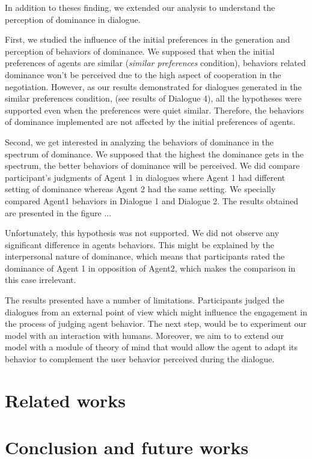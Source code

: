 \documentclass{llncs}
\begin{document}
			 In addition to theses finding, we extended our analysis to understand the perception of dominance in dialogue.
			 
			 First, we studied the influence of the initial preferences in the generation and perception of behaviors of dominance.
			 We supposed that when the initial preferences of agents are similar (\textit{similar preferences} condition), behaviors related dominance won't be perceived due to the high aspect of cooperation in the negotiation. However, as our results demonstrated for dialogues generated in the similar preferences condition, (see results of Dialogue 4), all the hypotheses were supported even when the preferences were quiet similar. Therefore, the behaviors of dominance implemented are not affected by the initial preferences of agents.
			 
			 Second, we get interested in analyzing the behaviors of dominance in the spectrum of dominance. We supposed that the highest the dominance gets in the spectrum, the better behaviors of dominance will be perceived. We did compare participant's judgments of Agent 1 in dialogues where Agent 1 had different setting of dominance whereas Agent 2 had the same setting. We specially compared Agent1 behaviors in Dialogue 1 and Dialogue 2. The results obtained are presented in the figure ... 
			 
			 Unfortunately, this hypothesis was not supported. We did not observe any significant difference in agents behaviors. This might be explained by the interpersonal nature of dominance, which means that participants rated the dominance of Agent 1 in opposition of Agent2, which makes the comparison in this case irrelevant. 
			 
			 \par  The results presented have a number of limitations. Participants judged the dialogues from an external point of view which might influence the engagement in the process of judging agent behavior. The next step, would be to experiment our model with an interaction with humans. Moreover, we aim to to extend our model with a module of theory of mind that would allow the agent to adapt its behavior to complement the user behavior perceived during the dialogue.
			 
			 
			 \section{Related works}			
			 	
			 \section{Conclusion and future works}
			\vskip 4pt
			
			
			
\end{document}
